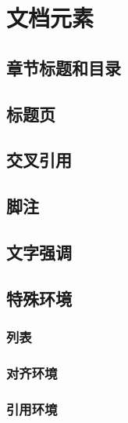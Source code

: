\chapter{文档元素}

\leavevmode\nobreakspace

\section{章节标题和目录}

\leavevmode\nobreakspace

\section{标题页}

\leavevmode\nobreakspace

\section{交叉引用}

\leavevmode\nobreakspace

\section{脚注}

\leavevmode\nobreakspace

\section{文字强调}

\leavevmode\nobreakspace

\section{特殊环境}

\leavevmode\nobreakspace

\subsection{列表}

\leavevmode\nobreakspace

\subsection{对齐环境}

\leavevmode\nobreakspace

\subsection{引用环境}

